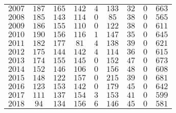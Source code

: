 \begin{longtable}{|l|cccccccc|}
    $2007$  & $187$ & $165$ & $142$ & $4$   & $133$ & $32$  & $0$   & $663$ \\
    $2008$  & $185$ & $143$ & $114$ & $0$   & $85$  & $38$  & $0$   & $565$ \\
    $2009$  & $186$ & $155$ & $110$ & $0$   & $122$ & $38$  & $0$   & $611$ \\
    $2010$  & $190$ & $156$ & $116$ & $1$   & $147$ & $35$  & $0$   & $645$ \\
    $2011$  & $182$ & $177$ & $81$  & $4$   & $138$ & $39$  & $0$   & $621$ \\
    $2012$  & $175$ & $144$ & $142$ & $4$   & $114$ & $36$  & $0$   & $615$ \\
    $2013$  & $174$ & $155$ & $145$ & $0$   & $152$ & $47$  & $0$   & $673$ \\
    $2014$  & $152$ & $146$ & $106$ & $0$   & $156$ & $48$  & $0$   & $608$ \\
    $2015$  & $148$ & $122$ & $157$ & $0$   & $215$ & $39$  & $0$   & $681$ \\
    $2016$  & $123$ & $153$ & $142$ & $0$   & $179$ & $45$  & $0$   & $642$ \\
    $2017$  & $111$ & $137$ & $154$ & $3$   & $153$ & $41$  & $0$   & $599$ \\
    $2018$  & $94$  & $134$ & $156$ & $6$   & $146$ & $45$  & $0$   & $581$
\hline
\end{longtable}

\begin{landscape}
\begin{figure}[H]
\centering
\end{figure}
\end{landscape}
